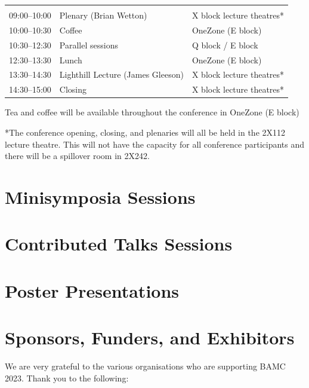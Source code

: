 \documentclass[12pt,a4paper]{article}
\begin{document}
\begin{tabularx}{\linewidth}{P{20mm}YP{50mm}}
  \\
  09:00--10:00 & Plenary (Brian Wetton) & X block lecture theatres*\\
  10:00--10:30 & Coffee & OneZone (E block) \\
  10:30--12:30 & Parallel sessions & Q block / E block\\
  12:30--13:30 & Lunch & OneZone (E block)\\
  13:30--14:30 & Lighthill Lecture (James Gleeson) & X block lecture theatres*\\
  14:30--15:00 & Closing & X block lecture theatres*
\end{tabularx}

Tea and coffee will be available throughout the conference in OneZone (E block)

*The conference opening, closing, and plenaries will all be held in the 2X112 lecture theatre. This will not have the capacity for all conference participants and there will be a spillover room in 2X242.


\section{Minisymposia Sessions}



\section{Contributed Talks Sessions}



\section{Poster Presentations}

{\footnotesize\raggedright}

\section{Sponsors, Funders, and Exhibitors}

We are very grateful to the various organisations who are supporting BAMC 2023. Thank you to the following:\bigskip
\end{document}
